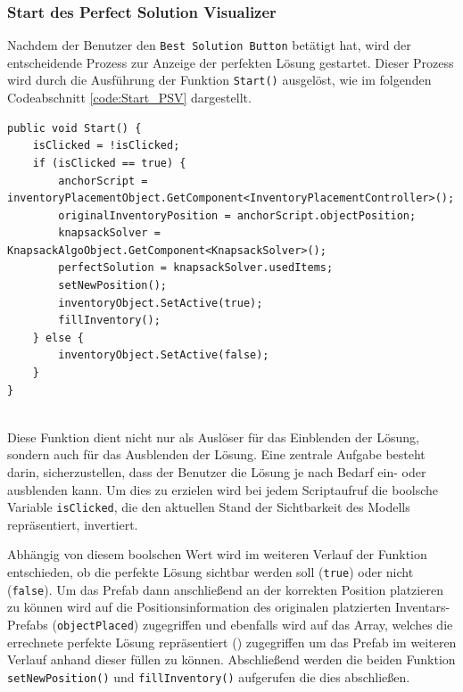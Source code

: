 \subsubsection{Start des Perfect Solution Visualizer}
Nachdem der Benutzer den \texttt{Best Solution Button} betätigt hat, wird der entscheidende Prozess zur Anzeige der perfekten
Lösung gestartet. Dieser Prozess wird durch die Ausführung der Funktion \texttt{Start()} ausgelöst, wie im folgenden
Codeabschnitt \ref{code:Start_PSV} dargestellt.
\begin{lstlisting}[style=csharp, caption={PerfectSolutionVisualizer Start}, label=code:Start_PSV]
public void Start() {
    isClicked = !isClicked;
    if (isClicked == true) {
        anchorScript = inventoryPlacementObject.GetComponent<InventoryPlacementController>();
        originalInventoryPosition = anchorScript.objectPosition;
        knapsackSolver = KnapsackAlgoObject.GetComponent<KnapsackSolver>();
        perfectSolution = knapsackSolver.usedItems;
        setNewPosition();
        inventoryObject.SetActive(true);
        fillInventory();
    } else {
        inventoryObject.SetActive(false);
    }
}
\end{lstlisting}\\
Diese Funktion dient nicht nur als Auslöser für das Einblenden der Lösung, sondern auch für das Ausblenden der Lösung.
Eine zentrale Aufgabe besteht darin, sicherzustellen, dass der Benutzer die Lösung je nach Bedarf ein- oder ausblenden
kann. Um dies zu erzielen wird bei jedem Scriptaufruf die boolsche Variable \texttt{isClicked}, die den aktuellen Stand
der Sichtbarkeit des Modells repräsentiert, invertiert.

Abhängig von diesem boolschen Wert wird im weiteren Verlauf der Funktion entschieden, ob die perfekte Lösung sichtbar
werden soll (\texttt{true}) oder nicht (\texttt{false}). Um das Prefab dann anschließend an der korrekten Position platzieren
zu können wird auf die Positionsinformation des originalen platzierten Inventars-Prefabs (\texttt{objectPlaced}) zugegriffen
und ebenfalls wird auf das Array, welches die errechnete perfekte Lösung repräsentiert () zugegriffen
um das Prefab im weiteren Verlauf anhand dieser füllen zu können. Abschließend werden die beiden Funktion \texttt{setNewPosition()}
und \texttt{fillInventory()} aufgerufen die dies abschließen.


